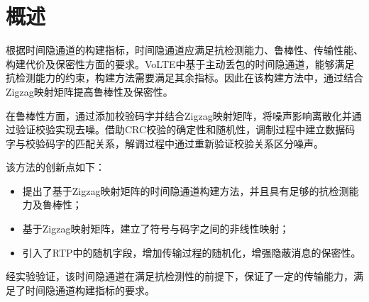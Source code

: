\section{概述}
\label{chap:zigzag:overview}

根据时间隐通道的构建指标，时间隐通道应满足抗检测能力、鲁棒性、传输性能、构建代价及保密性方面的要求。VoLTE中基于主动丢包的时间隐通道，能够满足抗检测能力的约束，构建方法需要满足其余指标。因此在该构建方法中，通过结合Zigzag映射矩阵提高鲁棒性及保密性。

在鲁棒性方面，通过添加校验码字并结合Zigzag映射矩阵，将噪声影响离散化并通过验证校验实现去噪。借助CRC校验的确定性和随机性，调制过程中建立数据码字与校验码字的匹配关系，解调过程中通过重新验证校验关系区分噪声。

该方法的创新点如下：
\begin{itemize}
	\item 提出了基于Zigzag映射矩阵的时间隐通道构建方法，并且具有足够的抗检测能力及鲁棒性；
	\item 基于Zigzag映射矩阵，建立了符号与码字之间的非线性映射；
	\item 引入了RTP中的随机字段，增加传输过程的随机化，增强隐蔽消息的保密性。
\end{itemize}

经实验验证，该时间隐通道在满足抗检测性的前提下，保证了一定的传输能力，满足了时间隐通道构建指标的要求。